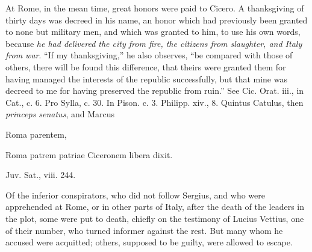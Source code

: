 At Rome, in the mean time, great honors were paid to Cicero. A
thanksgiving of thirty days was decreed in his name, an honor which
had previously been granted to none but military men, and which was
granted to him, to use his own words, because \emph{he had delivered the
city from fire, the citizens from slaughter, and Italy from war}. ``If
my thanksgiving,'' he also observes, ``be compared with those of others,
there will be found this difference, that theirs were granted them for
having managed the interests of the republic successfully, but that
mine was decreed to me for having preserved the republic from ruin.''
See Cic. Orat. iii., in Cat., c. 6. Pro Sylla, c. 30. In Pison. c. 3.
Philipp. xiv., 8. Quintus Catulus, then \emph{princeps senatus}, and Marcus

Roma parentem,

Roma patrem patriae Ciceronem libera dixit.

Juv. Sat., viii. 244.

Of the inferior conspirators, who did not follow Sergius, and who were
apprehended at Rome, or in other parts of Italy, after the death of
the leaders in the plot, some were put to death, chiefly on the
testimony of Lucius Vettius, one of their number, who turned informer
against the rest. But many whom he accused were acquitted; others,
supposed to be guilty, were allowed to escape.



